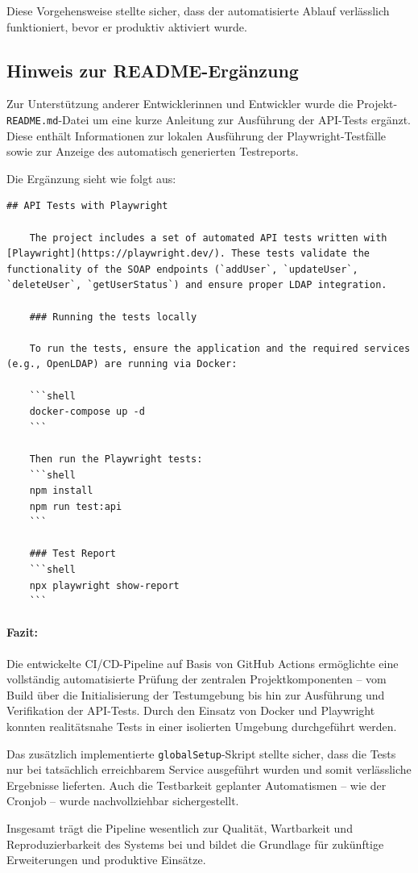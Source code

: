 Diese Vorgehensweise stellte sicher, dass der automatisierte Ablauf verlässlich funktioniert, bevor er produktiv aktiviert wurde.

\subsection{Hinweis zur README-Ergänzung}

Zur Unterstützung anderer Entwicklerinnen und Entwickler wurde die Projekt-\texttt{README.md}-Datei um eine kurze Anleitung zur Ausführung der API-Tests ergänzt. Diese enthält Informationen zur lokalen Ausführung der Playwright-Testfälle sowie zur Anzeige des automatisch generierten Testreports.

Die Ergänzung sieht wie folgt aus:

\begin{lstlisting}[language=Plaintext, caption={Ausschnitt aus der erweiterten README.md}]
    ## API Tests with Playwright

    The project includes a set of automated API tests written with [Playwright](https://playwright.dev/). These tests validate the functionality of the SOAP endpoints (`addUser`, `updateUser`, `deleteUser`, `getUserStatus`) and ensure proper LDAP integration.
    
    ### Running the tests locally
    
    To run the tests, ensure the application and the required services (e.g., OpenLDAP) are running via Docker:
    
    ```shell
    docker-compose up -d
    ```
    
    Then run the Playwright tests:
    ```shell
    npm install
    npm run test:api
    ```
    
    ### Test Report
    ```shell
    npx playwright show-report
    ```\end{lstlisting}

\paragraph{Fazit:}

Die entwickelte CI/CD-Pipeline auf Basis von GitHub Actions ermöglichte eine vollständig automatisierte Prüfung der zentralen Projektkomponenten – vom Build über die Initialisierung der Testumgebung bis hin zur Ausführung und Verifikation der API-Tests. Durch den Einsatz von Docker und Playwright konnten realitätsnahe Tests in einer isolierten Umgebung durchgeführt werden. 

Das zusätzlich implementierte \texttt{globalSetup}-Skript stellte sicher, dass die Tests nur bei tatsächlich erreichbarem Service ausgeführt wurden und somit verlässliche Ergebnisse lieferten. Auch die Testbarkeit geplanter Automatismen – wie der Cronjob – wurde nachvollziehbar sichergestellt. 

Insgesamt trägt die Pipeline wesentlich zur Qualität, Wartbarkeit und Reproduzierbarkeit des Systems bei und bildet die Grundlage für zukünftige Erweiterungen und produktive Einsätze.


